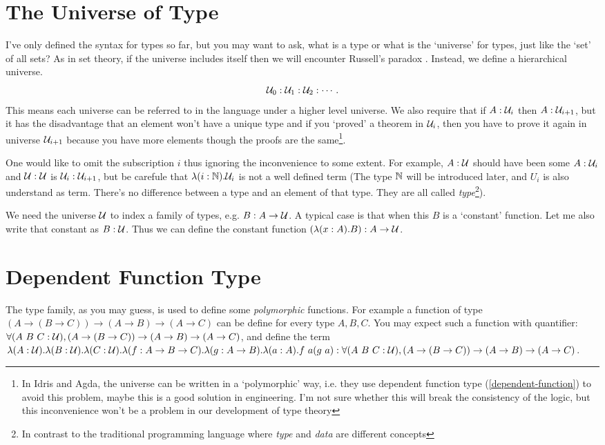 \section{The Universe of Type}
\label{type-universe}
I've only defined the syntax for types so far, but you may want to
ask, what is a type or what is the `universe' for types, just like the 
`set' of all sets? As in set theory, if the universe includes itself then
we will encounter Russell's paradox \cite{the-paradox-of-trees-in-type-theory}.
Instead, we define a hierarchical universe.
$$
    \mathcal{U}_0: \mathcal{U}_1: \mathcal{U}_2: \cdots.
$$
This means each universe can be referred to in the language under a higher
level universe. We also require that if $A: \mathcal{U}_i$ then 
$A: \mathcal{U}_{i+1}$, but it has the disadvantage that an element won't
have a unique type and if you `proved' a theorem in $\mathcal{U}_i$,
then you have to prove it again in universe $\mathcal{U}_{i+1}$ because
you have more elements though the proofs are the same\footnote{In Idris
and Agda, the universe can be written in a `polymorphic' way, i.e. they
use dependent function type (\autoref{dependent-function}) to avoid this problem, maybe
this is a good solution in engineering. I'm not sure whether this will break
the consistency of the logic, but this inconvenience won't be a problem
in our development of type theory}. 

One would like to omit the subscription $i$ thus ignoring the 
inconvenience to some extent. For example, $A:\mathcal{U}$ should have been 
some $A:\mathcal{U}_i$ and $\mathcal{U}:\mathcal{U}$ is 
$\mathcal{U}_i:\mathcal{U}_{i+1}$, but be carefule that 
$\lambda(i:\mathbb{N}). \mathcal{U}_i$ is not a well defined term (The type 
$\mathbb{N}$ will be introduced later, and $U_i$ is also understand as term.
There's no difference between a type and an element of that type. They
are all called {\it type}\footnote{In contrast to the traditional
programming language where {\it type} and {\it data} are different concepts}).

We need the universe $\mathcal{U}$ to index a family of types, e.g. 
$B:A\to\mathcal{U}$. A typical case is that when this $B$ is a `constant'
function. Let me also write that constant as $B:\mathcal{U}$. Thus we can define
the constant function $(\lambda(x:A).B):A\to \mathcal{U}$.


\section{Dependent Function Type}
The type family, as you may guess, is used to define some {\it polymorphic}
functions. For example a function of type $(A\to(B\to C))\to(A\to B)\to
(A\to C)$ can be define for every type $A, B, C$. You may expect such
a function with quantifier: $\forall (A\ B\ C: \mathcal{U}), 
(A\to(B\to C))\to(A\to B)\to (A\to C)$, and define the term
$\lambda (A:\universe).\lambda (B:\universe).\lambda (C:\universe).\lambda (f: A\to B\to C).
\lambda (g: A\to B).\lambda (a: A). f\ a (g\ a): \forall (A\ B\ C:\universe), 
(A\to(B\to C))\to(A\to B)\to (A\to C)$.

